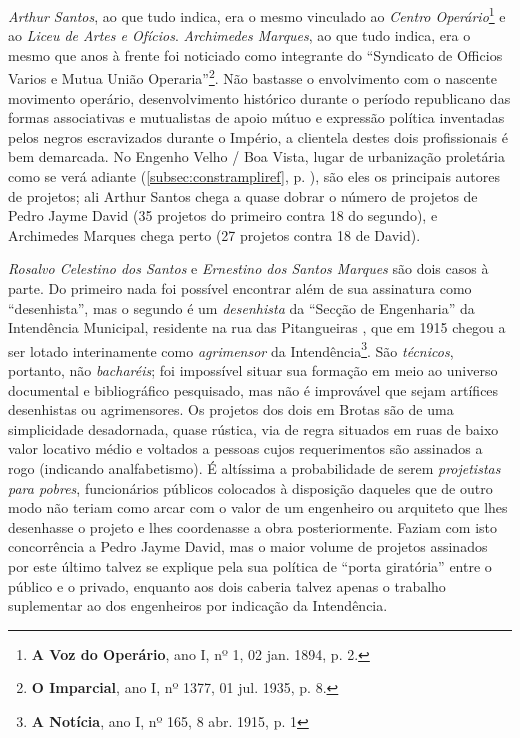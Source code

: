 \textit{Arthur Santos}, ao que tudo indica, era o mesmo vinculado ao \textit{Centro Operário}\footnote{\textbf{A Voz do Operário}, ano I, nº 1, 02 jan. 1894, p. 2.} e ao \textit{Liceu de Artes e Ofícios}. \textit{Archimedes Marques}, ao que tudo indica, era o mesmo que anos à frente foi noticiado como integrante do ``Syndicato de Officios Varios e Mutua União Operaria''\footnote{\textbf{O Imparcial}, ano I, nº 1377, 01 jul. 1935, p. 8.}. Não bastasse o envolvimento com o nascente movimento operário, desenvolvimento histórico durante o período republicano das formas associativas e mutualistas de apoio mútuo e expressão política inventadas pelos negros escravizados durante o Império, a clientela destes dois profissionais é bem demarcada. No Engenho Velho / Boa Vista, lugar de urbanização proletária como se verá adiante (\autoref{subsec:constrampliref}, p. \pageref{subsec:constrampliref}), são eles os principais autores de projetos; ali Arthur Santos chega a quase dobrar o número de projetos de Pedro Jayme David (35 projetos do primeiro contra 18 do segundo), e Archimedes Marques chega perto (27 projetos contra 18 de David).

\textit{Rosalvo Celestino dos Santos} e \textit{Ernestino dos Santos Marques} são dois casos à parte. Do primeiro nada foi possível encontrar além de sua assinatura como ``desenhista'', mas o segundo é um \textit{desenhista} da ``Secção de Engenharia'' da Intendência Municipal, residente na rua das Pitangueiras \cite[p.~279]{reis_almanak_1898}, que em 1915 chegou a ser lotado interinamente como \textit{agrimensor} da Intendência\footnote{\textbf{A Notícia}, ano I, nº 165, 8 abr. 1915, p. 1}. São \textit{técnicos}, portanto, não \textit{bacharéis}; foi impossível situar sua formação em meio ao universo documental e bibliográfico pesquisado, mas não é improvável que sejam artífices desenhistas ou agrimensores. Os projetos dos dois em Brotas são de uma simplicidade desadornada, quase rústica, via de regra situados em ruas de baixo valor locativo médio e voltados a pessoas cujos requerimentos são assinados a rogo (indicando analfabetismo). É altíssima a probabilidade de serem \textit{projetistas para pobres}, funcionários públicos colocados à disposição daqueles que de outro modo não teriam como arcar com o valor de um engenheiro ou arquiteto que lhes desenhasse o projeto e lhes coordenasse a obra posteriormente. Faziam com isto concorrência a Pedro Jayme David, mas o maior volume de projetos assinados por este último talvez se explique pela sua política de ``porta giratória'' entre o público e o privado, enquanto aos dois caberia talvez apenas o trabalho suplementar ao dos engenheiros por indicação da Intendência.

